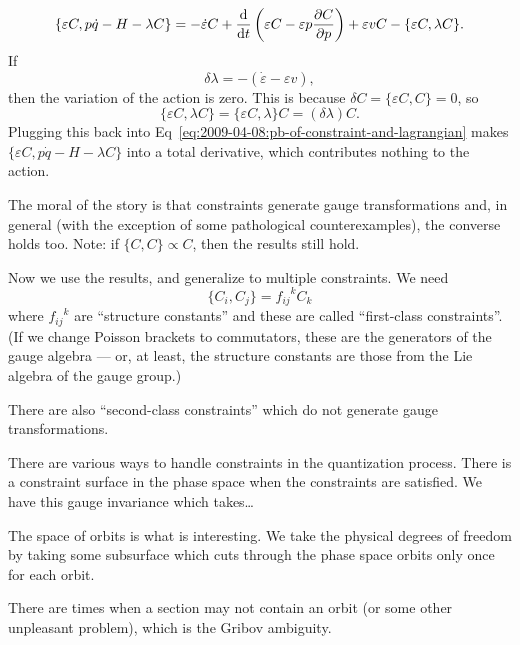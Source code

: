 \begin{equation}\label{eq:2009-04-08:pb-of-constraint-and-lagrangian}
  \{\varepsilon C, p\dot{q}-H-\lambda C\}
  = -\dot{\varepsilon}C + \frac{\mathrm{d}}{\mathrm{d} t}\left(\varepsilon C - \varepsilon p\frac{\partial C}{\partial p}\right)
+\varepsilon vC-\{\varepsilon C,\lambda C\}.
\end{equation}
If
\begin{equation}
\delta\lambda = -(\dot{\varepsilon}-\varepsilon v),
\end{equation}
then the variation of the action is zero. This is because $\delta C
=\{\varepsilon C,C\} = 0$, so
\begin{equation}
\{\varepsilon C,\lambda C\} = \{\varepsilon C,\lambda\}C = (\delta\lambda)C.
\end{equation}
Plugging this back into
Eq~\eqref{eq:2009-04-08:pb-of-constraint-and-lagrangian} makes
$\{\varepsilon C, p\dot{q}-H-\lambda C\}$ into a total derivative, which
contributes nothing to the action.

The moral of the story is that constraints generate gauge
transformations and, in general (with the exception of some pathological
counterexamples), the converse holds too. Note: if $\{C,C\}\propto C$,
then the results still hold.

Now we use the results, and generalize to multiple constraints. We need
\begin{equation}
\{C_{i},C_{j}\} = {f_{ij}}^{k}C_{k}
\end{equation}
where ${f_{ij}}^{k}$ are ``structure constants'' and these are called
``first-class constraints''. (If we change Poisson brackets to
commutators, these are the generators of the gauge algebra --- or, at
least, the structure constants are those from the Lie algebra of the
gauge group.)

There are also ``second-class constraints'' which do not generate gauge
transformations.

There are various ways to handle constraints in the quantization
process. There is a constraint surface in the phase space when the
constraints are satisfied. We have this gauge invariance which
takes\dots{}

The space of orbits is what is interesting. We take the physical degrees
of freedom by taking some subsurface which cuts through the phase space
orbits only once for each orbit.

There are times when a section may not contain an orbit (or some other
unpleasant problem), which is the Gribov ambiguity.

